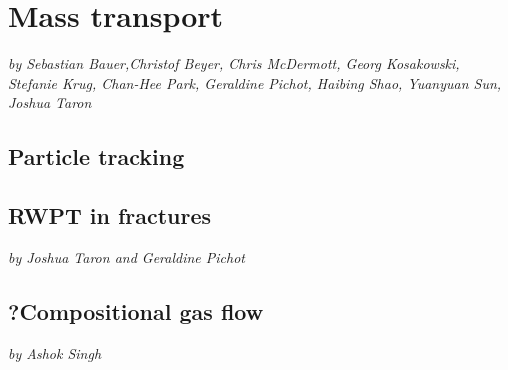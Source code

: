 \chapter{Mass transport}
\textit{by Sebastian Bauer,Christof Beyer, Chris McDermott, Georg Kosakowski, Stefanie Krug, Chan-Hee Park, Geraldine Pichot, Haibing Shao, Yuanyuan Sun, Joshua Taron}








\newpage
\section{Particle tracking}


\section{RWPT in fractures}
\textit{by Joshua Taron and Geraldine Pichot}


\section{?Compositional gas flow}
\textit{by Ashok Singh}

